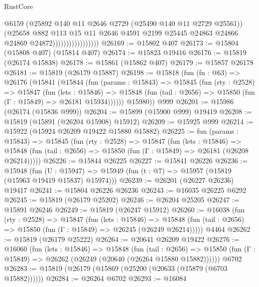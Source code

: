 \begin{lexlean}{RustCore}
\begin{coremodule}
                                    @6159
                                    (@25892 @140 @11 @2646 @2729 (@25490 @140 @11 @2729 @25561))
                                    (@25658
                                      @882
                                      @113
                                      @15
                                      @11
                                      @2646
                                      @4591
                                      @2199
                                      @25445
                                      @24863
                                      @24866
                                      @24869
                                      @24872)))))))))))))))))
@26169 := @15802 @407
@26173 := @15804 (@15808 @407) (@15814 @407)
@26174 := @15823 @19416
@26176 := @15819 (@26174 @15838)
@26178 := @15861 (@15862 @407)
@26179 := @15857 @26178
@26181 := @15819 (@26179 @15887)
@26198 := @15818
    (fun (fn : @63) =>
    @26176
      (@15841
        (@15844
          (fun (params : @15843) =>
          @15845
            (fun (rty : @2528) =>
            @15847
              (fun (lets : @15846) =>
              @15848 (fun (tail : @2656) => @15850 (fun (Γ : @15849) => @26181 @15934))))))
        @15980))
    @999
@26201 := @15986 (@26174 (@15836 @999))
@26204 := @15899 (@15900 @999) @19419
@26208 := @15819 (@15891 (@26204 @15908) @15912)
@26209 := @15925 @999
@26214 := @15922 (@15924 @26209 @19422 @15880 @15882)
@26225 := fun (params : @15843) =>
  @15845
    (fun (rty : @2528) =>
    @15847
      (fun (lets : @15846) =>
      @15848 (fun (tail : @2656) => @15850 (fun (Γ : @15849) => @26181 (@26208 @26214)))))
@26226 := @15844 @26225
@26227 := @15841 @26226
@26236 := @15948
    (fun (U : @15947) => @15949 (fun (t : @7) => @15957 (@15819 (@15963 @19419 @15837) @15974)))
@26239 := @26201 (@26227 @26236) @19417
@26241 := @15804 @26226 @26236
@26243 := @16035 @26225 @6292
@26245 := @15819 (@26179 @25202)
@26246 := @26204 @25205
@26247 := @15891 @26246
@26249 := @15819 (@26247 @15912)
@26260 := @16038
    (fun (rty : @2528) =>
    @15847
      (fun (lets : @15846) =>
      @15848 (fun (tail : @2656) => @15850 (fun (Γ : @15849) => @26245 (@26249 @26214)))))
    @4464
@26262 := @15819 (@26179 @25222)
@26264 := @20641 @26209 @19422
@26276 := @16060
    (fun (lets : @15846) =>
    @15848
      (fun (tail : @2656) =>
      @15850 (fun (Γ : @15849) => @26262 (@26249 (@20640 (@26264 @15880 @15882))))))
    @6702
@26283 := @15819 (@26179 (@15869 (@25200 (@20633 (@15879 (@6703 @15882))))))
@26284 := @26264 @6702
@26293 := @16084

\end{coremodule}
\end{lexlean}
